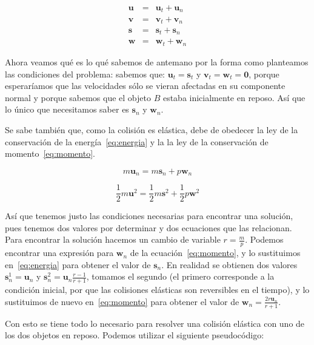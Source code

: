 \begin{eqnarray}
 \textbf{u} & = & \textbf{u}_t + \textbf{u}_n \nonumber \\
 \textbf{v} & = & \textbf{v}_t + \textbf{v}_n \nonumber \\
 \textbf{s} & = & \textbf{s}_t + \textbf{s}_n \nonumber \\
 \textbf{w} & = & \textbf{w}_t + \textbf{w}_n \nonumber
\end{eqnarray}

Ahora veamos qué es lo qué sabemos de antemano por la forma como planteamos las condiciones del problema: sabemos que: $\textbf{u}_t = \textbf{s}_t$ y $\textbf{v}_t = \textbf{w}_t = \textbf{0}$, porque esperaríamos que las velocidades sólo se vieran afectadas en su componente normal y porque sabemos que el objeto $B$ estaba inicialmente en reposo.
Así que lo único que necesitamos saber es $\textbf{s}_n$ y $\textbf{w}_n$.

Se sabe también que, como la colisión es elástica, debe de obedecer la ley de la conservación de la energía~\eqref{eq:energia} y la la ley de la conservación de momento~\eqref{eq:momento}.

\begin{equation}
m \textbf{u}_n = m \textbf{s}_n + p \textbf{w}_n
\label{eq:momento}
\end{equation}

\begin{equation}
\frac{1}{2} m \textbf{u}^2 = \frac{1}{2} m \textbf{s}^2 + \frac{1}{2} p \textbf{w}^2
\label{eq:energia}
\end{equation}

Así que tenemos justo las condiciones necesarias para encontrar una solución, pues tenemos dos valores por determinar y dos ecuaciones que las relacionan.
Para encontrar la solución hacemos un cambio de variable $r = \frac{m}{p}$.
Podemos encontrar una expresión para $\textbf{w}_n$ de la ecuación~\eqref{eq:momento}, y lo sustituimos en~\eqref{eq:energia} para obtener el valor de $\textbf{s}_n$. En realidad se obtienen dos valores $\textbf{s}_{n}^{1} = \textbf{u}_n$ y $\textbf{s}_{n}^{2} = \textbf{u}_n \frac{r-1}{r+1}$, tomamos el segundo (el primero corresponde a la condición inicial, por que las colisiones elásticas son reversibles en el tiempo), y lo sustituimos de nuevo en~\eqref{eq:momento} para obtener el valor de $\textbf{w}_n = \frac{2 r \textbf{u}_n}{r + 1}$.

Con esto se tiene todo lo necesario  para resolver una colisión elástica con uno de los dos objetos en reposo. Podemos utilizar el siguiente pseudocódigo:

